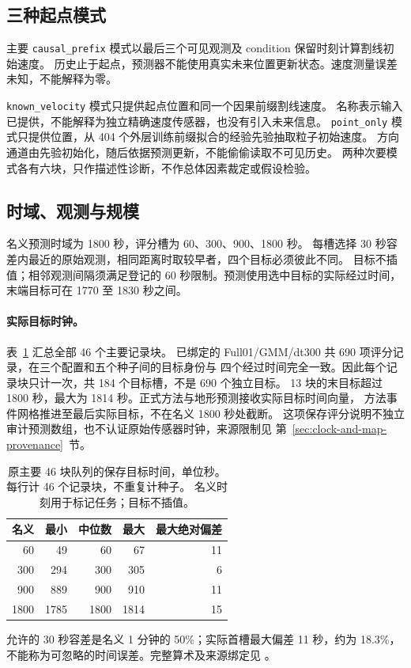 \documentclass[UTF8,11pt]{ctexart}
\begin{document}
\subsection{三种起点模式}
主要 \texttt{causal\_prefix} 模式以最后三个可见观测及 condition 保留时刻计算割线初始速度。
历史止于起点，预测器不能使用真实未来位置更新状态。速度测量误差未知，不能解释为零。

\texttt{known\_velocity} 模式只提供起点位置和同一个因果前缀割线速度。
名称表示输入已提供，不能解释为独立精确速度传感器，也没有引入未来信息。
\texttt{point\_only} 模式只提供位置，从 404 个外层训练前缀拟合的经验先验抽取粒子初始速度。
方向通道由先验初始化，随后依据预测更新，不能偷偷读取不可见历史。
两种次要模式各有六块，只作描述性诊断，不作总体因素裁定或假设检验。

\subsection{时域、观测与规模}
名义预测时域为 1800 秒，评分槽为 60、300、900、1800 秒。
每槽选择 30 秒容差内最近的原始观测，相同距离时取较早者，四个目标必须彼此不同。
目标不插值；相邻观测间隔须满足登记的 60 秒限制。预测使用选中目标的实际经过时间，
末端目标可在 1770 至 1830 秒之间。

\paragraph{实际目标时钟。}\label{sec:target-times}
表~\ref{tab:actual-target-times} 汇总全部 46 个主要记录块。
已绑定的 Full01/GMM/dt300 共 690 项评分记录，在三个配置和五个种子间的目标身份与
四个经过时间完全一致。因此每个记录块只计一次，共 184 个目标槽，不是 690 个独立目标。
13 块的末目标超过 1800 秒，最大为 1814 秒。正式方法与地形预测接收实际目标时间向量，
方法事件网格推进至最后实际目标，不在名义 1800 秒处截断。
这项保存评分说明不独立审计预测数组，也不认证原始传感器时钟，来源限制见
第~\ref{sec:clock-and-map-provenance}~节。

\begin{table}[htbp]
\centering\small
\caption{原主要 46 块队列的保存目标时间，单位秒。每行计 46 个记录块，不重复计种子。
名义时刻用于标记任务；目标不插值。}
\label{tab:actual-target-times}
\begin{tabular}{@{}rrrrr@{}}
\toprule
名义 & 最小 & 中位数 & 最大 & 最大绝对偏差\\
\midrule
60 & 49 & 60 & 67 & 11\\
300 & 294 & 300 & 305 & 6\\
900 & 889 & 900 & 910 & 11\\
1800 & 1785 & 1800 & 1814 & 15\\
\bottomrule
\end{tabular}
\end{table}
允许的 30 秒容差是名义 1 分钟的 50\%；实际首槽最大偏差 11 秒，约为 18.3\%，
不能称为可忽略的时间误差。完整算术及来源绑定见
。
\end{document}
